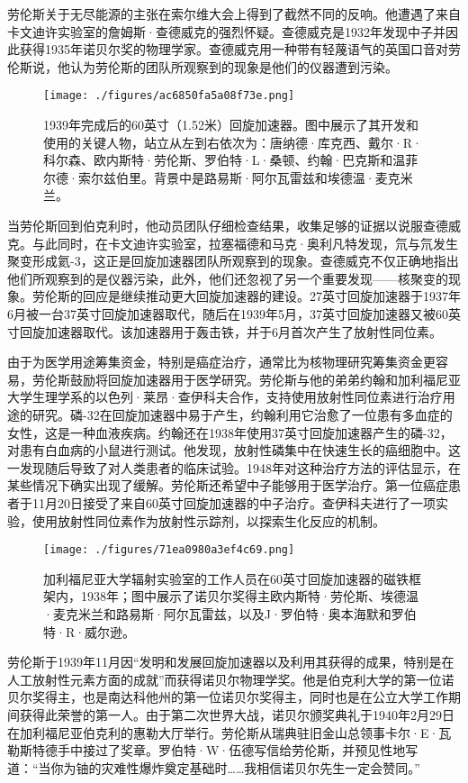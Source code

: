 劳伦斯关于无尽能源的主张在索尔维大会上得到了截然不同的反响。他遭遇了来自卡文迪许实验室的詹姆斯·查德威克的强烈怀疑。查德威克是1932年发现中子并因此获得1935年诺贝尔奖的物理学家。查德威克用一种带有轻蔑语气的英国口音对劳伦斯说，他认为劳伦斯的团队所观察到的现象是他们的仪器遭到污染。
\begin{figure}[ht]
\centering
\texttt{[image: ./figures/ac6850fa5a08f73e.png]}
\caption{1939年完成后的60英寸（1.52米）回旋加速器。图中展示了其开发和使用的关键人物，站立从左到右依次为：唐纳德·库克西、戴尔·R·科尔森、欧内斯特·劳伦斯、罗伯特·L·桑顿、约翰·巴克斯和温菲尔德·索尔兹伯里。背景中是路易斯·阿尔瓦雷兹和埃德温·麦克米兰。} \label{fig_ONST_3}
\end{figure}
当劳伦斯回到伯克利时，他动员团队仔细检查结果，收集足够的证据以说服查德威克。与此同时，在卡文迪许实验室，拉塞福德和马克·奥利凡特发现，氘与氘发生聚变形成氦-3，这正是回旋加速器团队所观察到的现象。查德威克不仅正确地指出他们所观察到的是仪器污染，此外，他们还忽视了另一个重要发现——核聚变的现象。劳伦斯的回应是继续推动更大回旋加速器的建设。27英寸回旋加速器于1937年6月被一台37英寸回旋加速器取代，随后在1939年5月，37英寸回旋加速器又被60英寸回旋加速器取代。该加速器用于轰击铁，并于6月首次产生了放射性同位素。

由于为医学用途筹集资金，特别是癌症治疗，通常比为核物理研究筹集资金更容易，劳伦斯鼓励将回旋加速器用于医学研究。劳伦斯与他的弟弟约翰和加利福尼亚大学生理学系的以色列·莱昂·查伊科夫合作，支持使用放射性同位素进行治疗用途的研究。磷-32在回旋加速器中易于产生，约翰利用它治愈了一位患有多血症的女性，这是一种血液疾病。约翰还在1938年使用37英寸回旋加速器产生的磷-32，对患有白血病的小鼠进行测试。他发现，放射性磷集中在快速生长的癌细胞中。这一发现随后导致了对人类患者的临床试验。1948年对这种治疗方法的评估显示，在某些情况下确实出现了缓解。劳伦斯还希望中子能够用于医学治疗。第一位癌症患者于11月20日接受了来自60英寸回旋加速器的中子治疗。查伊科夫进行了一项实验，使用放射性同位素作为放射性示踪剂，以探索生化反应的机制。
\begin{figure}[ht]
\centering
\texttt{[image: ./figures/71ea0980a3ef4c69.png]}
\caption{加利福尼亚大学辐射实验室的工作人员在60英寸回旋加速器的磁铁框架内，1938年；图中展示了诺贝尔奖得主欧内斯特·劳伦斯、埃德温·麦克米兰和路易斯·阿尔瓦雷兹，以及J·罗伯特·奥本海默和罗伯特·R·威尔逊。} \label{fig_ONST_4}
\end{figure}
劳伦斯于1939年11月因“发明和发展回旋加速器以及利用其获得的成果，特别是在人工放射性元素方面的成就”而获得诺贝尔物理学奖。他是伯克利大学的第一位诺贝尔奖得主，也是南达科他州的第一位诺贝尔奖得主，同时也是在公立大学工作期间获得此荣誉的第一人。由于第二次世界大战，诺贝尔颁奖典礼于1940年2月29日在加利福尼亚伯克利的惠勒大厅举行。劳伦斯从瑞典驻旧金山总领事卡尔·E·瓦勒斯特德手中接过了奖章。罗伯特·W·伍德写信给劳伦斯，并预见性地写道：“当你为铀的灾难性爆炸奠定基础时……我相信诺贝尔先生一定会赞同。”

